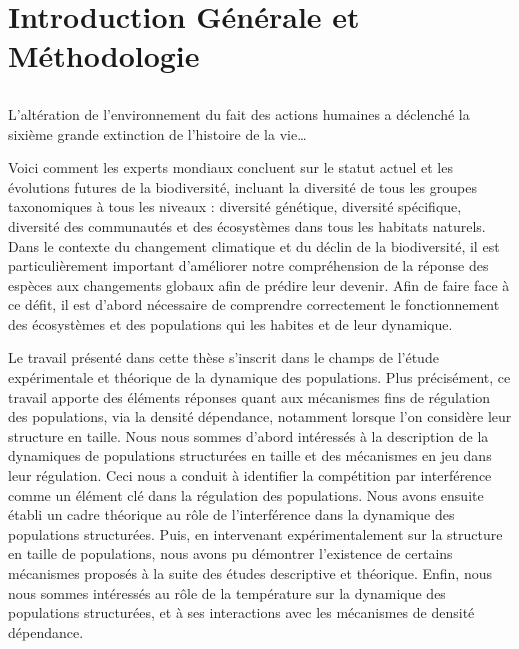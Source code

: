 \part{Introduction Générale et Méthodologie}

\chapter*[Introduction]{}

\vspace{-5cm}

\og L'altération de l'environnement du fait des actions
humaines a déclenché la sixième grande extinction de l'histoire de la vie\ldots\fg
\autocites{stuart-chapin-iii2000a}

Voici comment les experts mondiaux concluent sur le statut actuel et les
évolutions futures de la biodiversité, incluant la diversité de tous les groupes
taxonomiques à tous les niveaux : diversité génétique, diversité spécifique,
diversité des communautés et des écosystèmes dans tous les habitats naturels.
Dans le contexte du changement climatique et du déclin de la biodiversité, il
est particulièrement important d'améliorer notre compréhension de la réponse
des espèces aux changements globaux afin de prédire leur devenir. Afin de faire
face à ce défit, il est d'abord nécessaire de comprendre correctement le
fonctionnement des écosystèmes et des populations qui les habites et de leur
dynamique. 

Le travail présenté dans cette thèse s'inscrit dans le champs de l'étude
expérimentale et théorique de la dynamique des populations. Plus précisément, ce
travail apporte des éléments réponses quant aux mécanismes fins de régulation
des populations, via la densité dépendance, notamment lorsque l'on considère
leur structure en taille.
Nous nous sommes d'abord intéressés à la description de la dynamiques
de populations structurées en taille et des mécanismes en jeu dans leur
régulation. Ceci nous a conduit à identifier la compétition par interférence
comme un élément clé dans la régulation des populations.
Nous avons ensuite établi un cadre théorique au rôle de l'interférence dans la
dynamique des populations structurées. Puis, en intervenant expérimentalement
sur la structure en taille de populations, nous avons pu démontrer 
l'existence de certains mécanismes proposés à la suite des études descriptive et
théorique.
Enfin, nous nous sommes intéressés au rôle de la température sur la dynamique
des populations structurées, et à ses interactions avec les mécanismes de densité
dépendance.





